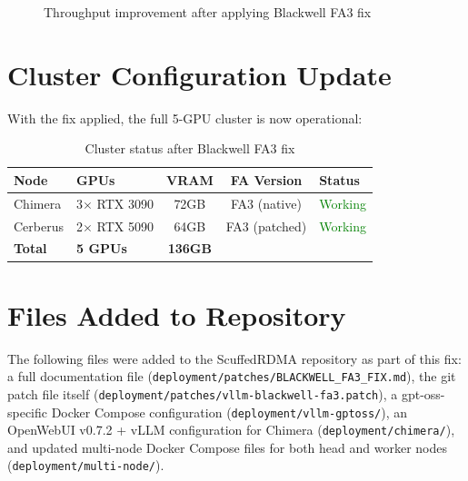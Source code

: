 \documentclass[10pt,letterpaper]{article}
\begin{document}
\begin{figure}[H]
\centering
{}
\caption{Throughput improvement after applying Blackwell FA3 fix}
\end{figure}

\section{Cluster Configuration Update}

With the fix applied, the full 5-GPU cluster is now operational:

\begin{table}[H]
\centering
\small
\begin{tabular}{@{}llccl@{}}
\toprule
\textbf{Node} & \textbf{GPUs} & \textbf{VRAM} & \textbf{FA Version} & \textbf{Status} \\
\midrule
Chimera & 3$\times$ RTX 3090 & 72GB & FA3 (native) & \textcolor{green}{Working} \\
Cerberus & 2$\times$ RTX 5090 & 64GB & FA3 (patched) & \textcolor{green}{Working} \\
\midrule
\textbf{Total} & \textbf{5 GPUs} & \textbf{136GB} & & \\
\bottomrule
\end{tabular}
\caption{Cluster status after Blackwell FA3 fix}
\end{table}

\section{Files Added to Repository}

The following files were added to the ScuffedRDMA repository as part of this fix: a full documentation file (\texttt{deployment/patches/BLACKWELL\_FA3\_FIX.md}), the git patch file itself (\texttt{deployment/patches/vllm-blackwell-fa3.patch}), a gpt-oss-specific Docker Compose configuration (\texttt{deployment/vllm-gptoss/}), an OpenWebUI v0.7.2 + vLLM configuration for Chimera (\texttt{deployment/chimera/}), and updated multi-node Docker Compose files for both head and worker nodes (\texttt{deployment/multi-node/}).
\end{document}
